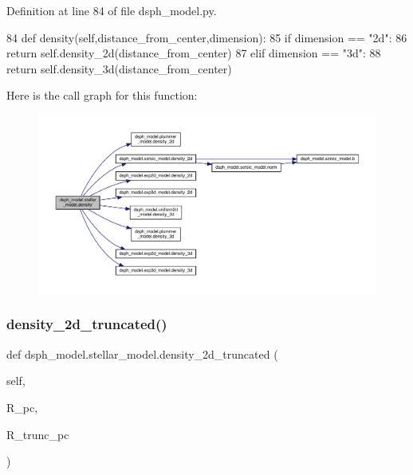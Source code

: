 Definition at line 84 of file dsph\+\_\+model.\+py.


\begin{DoxyCode}
84     \textcolor{keyword}{def }density(self,distance\_from\_center,dimension):
85         \textcolor{keywordflow}{if} dimension == \textcolor{stringliteral}{"2d"}:
86             \textcolor{keywordflow}{return} self.density\_2d(distance\_from\_center)
87         \textcolor{keywordflow}{elif} dimension == \textcolor{stringliteral}{"3d"}:
88             \textcolor{keywordflow}{return} self.density\_3d(distance\_from\_center)
\end{DoxyCode}
Here is the call graph for this function\+:\nopagebreak
\begin{figure}[H]
\begin{center}
\leavevmode
\includegraphics[width=350pt]{d0/db5/classdsph__model_1_1stellar__model_a9a444748be87bd42c8a6e0c4e6b6de43_cgraph}
\end{center}
\end{figure}
\mbox{\label{classdsph__model_1_1stellar__model_acde2267ff0b15d0177b5eef57fd006ed}} 
\subsubsection{\texorpdfstring{density\+\_\+2d\+\_\+truncated()}{density\_2d\_truncated()}}
{\footnotesize\ttfamily def dsph\+\_\+model.\+stellar\+\_\+model.\+density\+\_\+2d\+\_\+truncated (\begin{DoxyParamCaption}\item[{}]{self,  }\item[{}]{R\+\_\+pc,  }\item[{}]{R\+\_\+trunc\+\_\+pc }\end{DoxyParamCaption})}

